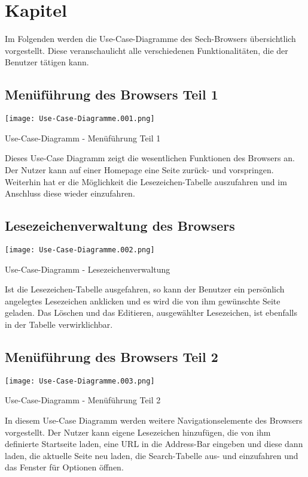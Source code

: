 
\chapter{Kapitel}

Im Folgenden werden die Use-Case-Diagramme des Sech-Browsers übersichtlich vorgestellt. Diese veranschaulicht alle verschiedenen Funktionalitäten, die der Benutzer tätigen kann.

\section{Menüführung des Browsers Teil 1}

\texttt{[image: Use-Case-Diagramme.001.png]}
	\caption{Use-Case-Diagramm - Menüführung Teil 1}
	\label{fig:Menüführung Teil 1}
	
Dieses Use-Case Diagramm zeigt die wesentlichen Funktionen des Browsers an. Der Nutzer kann auf einer Homepage eine Seite zurück- und vorspringen. Weiterhin hat er die Möglichkeit die Lesezeichen-Tabelle auszufahren und im Anschluss diese wieder einzufahren.

\section{Lesezeichenverwaltung des Browsers}

\texttt{[image: Use-Case-Diagramme.002.png]}
	\caption{Use-Case-Diagramm - Lesezeichenverwaltung}
	\label{fig:Lesezeichenverwaltung}

Ist die Lesezeichen-Tabelle ausgefahren, so kann der Benutzer ein persönlich angelegtes Lesezeichen anklicken und es wird die von ihm gewünschte Seite geladen. Das Löschen und das Editieren, ausgewählter Lesezeichen, ist ebenfalls in der Tabelle verwirklichbar.

\section{Menüführung des Browsers Teil 2}

\texttt{[image: Use-Case-Diagramme.003.png]}
	\caption{Use-Case-Diagramm - Menüführung Teil 2}
	\label{fig:Menüführung Teil 2}

In diesem Use-Case Diagramm werden weitere Navigationselemente des Browsers vorgestellt. Der Nutzer kann eigene Lesezeichen hinzufügen, die von ihm definierte Startseite laden, eine URL in die Address-Bar eingeben und diese dann laden, die aktuelle Seite neu laden, die Search-Tabelle aus- und einzufahren und das Fenster für Optionen öffnen.

